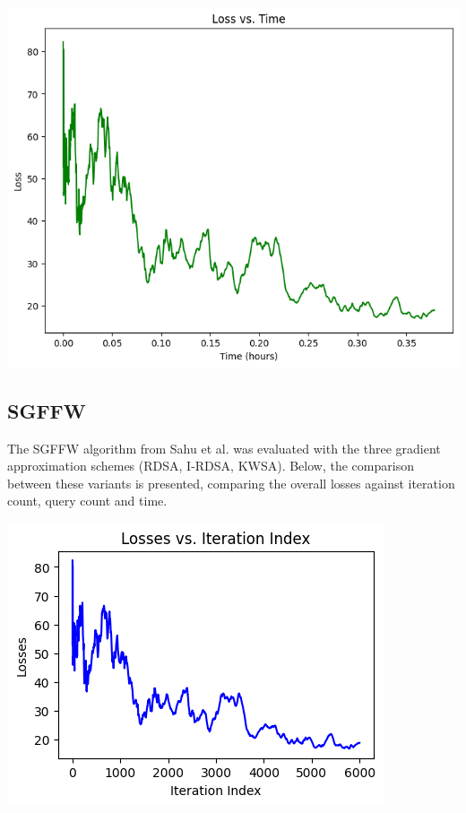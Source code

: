 \documentclass[10pt,twocolumn,letterpaper]{article}
\begin{document}
\begin{center}
   \includegraphics*[scale=0.40]{img/RDSA_loss_vs_time.png}
\end{center}

\subsection{SGFFW}

The SGFFW algorithm from Sahu et al. was evaluated with the three
gradient approximation schemes (RDSA, I-RDSA, KWSA).
Below, the comparison between these variants is presented,
comparing the overall losses against iteration count, query count and time.

\begin{center}
   \includegraphics*[scale=0.7]{img/RDSA_loss_vs_iterations.png}
\end{center}
\end{document}
